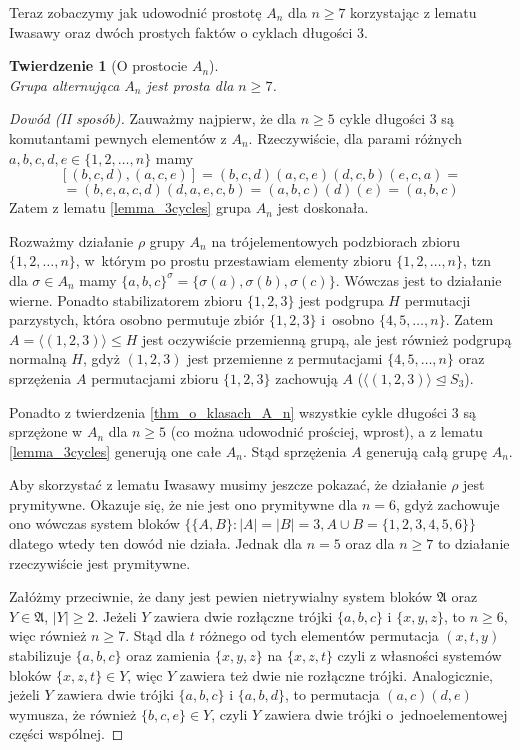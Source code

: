 \documentclass[licencjacka]{pracamgr}
\newtheorem{thh}{Twierdzenie}[section]
\begin{document}
Teraz zobaczymy jak udowodnić prostotę $A_n$ dla $n \ge 7$ korzystając z lematu Iwasawy 
oraz dwóch prostych faktów o cyklach długości 3.

\addtocounter{chapter}{-2}
\begin{thh}[O prostocie $A_n$] $ $ \\
    Grupa alternująca $A_n$ jest prosta dla $n \ge 7$.
\end{thh}
\begin{proof}[Dowód (II sposób)]
  Zauważmy najpierw, że dla $n \ge 5$ cykle długości 3 są komutantami pewnych elementów z $A_n$.
  Rzeczywiście, dla parami różnych $a, b, c, d, e \in \{ 1, 2, \ldots, n \}$ mamy
  $$ [(b, c, d),(a, c, e)] = (b, c, d)(a, c, e)(d, c, b)(e, c, a) = $$
  $$ = (b, e, a, c, d)(d, a, e, c, b) = (a, b, c)(d)(e) = (a, b, c)$$
  Zatem z lematu \ref{lemma_3cycles} grupa $A_n$ jest doskonała.

  Rozważmy działanie $\rho$ grupy $A_n$ na trójelementowych podzbiorach zbioru $\{ 1, 2, \ldots, n \}$,
  w~którym po prostu przestawiam elementy zbioru $\{1, 2, \ldots, n\}$, 
  tzn dla $\sigma \in A_n$ mamy $\{a, b, c \}^\sigma = \{ \sigma(a), \sigma(b), \sigma(c) \}$.
  Wówczas jest to działanie wierne.
  Ponadto stabilizatorem zbioru $\{1, 2, 3\}$ jest podgrupa $H$ permutacji parzystych, 
  która osobno permutuje zbiór $\{1, 2, 3\}$ i~osobno $\{4, 5, \ldots, n\}$.
  Zatem $A =  \langle (1, 2, 3)  \rangle \le H$ jest oczywiście przemienną grupą,
  ale jest również podgrupą normalną $H$, gdyż $(1, 2, 3)$ jest przemienne z permutacjami $\{4, 5, \ldots, n\}$
  oraz sprzężenia $A$ permutacjami zbioru $\{1, 2, 3\}$ zachowują $A$ ($\langle (1, 2, 3)  \rangle \unlhd S_3$).
  
  Ponadto z twierdzenia \ref{thm_o_klasach_A_n} wszystkie cykle długości 3 są sprzężone w $A_n$ dla $n \ge 5$
  (co można udowodnić prościej, wprost), a z lematu \ref{lemma_3cycles} generują one całe $A_n$.
  Stąd sprzężenia $A$ generują całą grupę $A_n$.

  Aby skorzystać z lematu Iwasawy musimy jeszcze pokazać, że działanie $\rho$ jest prymitywne.
  Okazuje się, że nie jest ono prymitywne dla $n = 6$, gdyż zachowuje ono wówczas system bloków
  $\{\{A, B\} \colon |A| = |B| = 3, A \cup B = \{1, 2, 3, 4, 5, 6 \} \}$ dlatego wtedy ten dowód nie działa.
  Jednak dla $n = 5$ oraz dla $n \ge 7$ to działanie rzeczywiście jest prymitywne.

  Załóżmy przeciwnie, że dany jest pewien nietrywialny system bloków $\mathfrak{A}$ oraz
  $Y \in \mathfrak{A}$, $|Y| \ge 2$.
  Jeżeli $Y$ zawiera dwie rozłączne trójki $\{a, b, c\}$ i $\{x, y, z\}$, to $n \ge 6$, więc również $n \ge 7$.
  Stąd dla $t$ różnego od tych elementów permutacja $(x, t, y)$ stabilizuje $\{a, b, c\}$ oraz 
  zamienia $\{x, y, z\}$ na $\{x, z, t\}$ czyli z własności systemów bloków
  $\{x, z, t\} \in Y$, więc $Y$ zawiera też dwie nie rozłączne trójki.
  Analogicznie, jeżeli $Y$ zawiera dwie trójki $\{a, b, c\}$ i $\{a, b, d\}$, 
  to permutacja $(a, c)(d, e)$ wymusza, że również $\{b, c, e\} \in Y$, czyli $Y$ zawiera dwie trójki o~jednoelementowej części wspólnej.


\end{proof}
\end{document}
